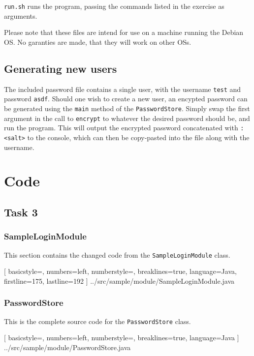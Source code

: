 \documentclass{article}
\begin{document}
\texttt{run.sh} runs the program, passing the commands listed in the exercise as
arguments.

Please note that these files are intend for use on a machine running the Debian OS.
No garanties are made, that they will work on other OSs.

\subsection{Generating new users}
The included password file contains a single user, with the username
\texttt{test} and password \texttt{asdf}.
Should one wish to create a new user, an encypted password can be
generated using the \texttt{main} method of the \texttt{PasswordStore}.
Simply swap the first argument in the call to \texttt{encrypt} to whatever
the desired password should be, and run the program.
This will output the encrypted password concatenated with \texttt{:<salt>}
to the console, which can then be copy-pasted into the file along with the username.

\newpage
\appendix

\section{Code}

\subsection{Task 3}

\subsubsection{SampleLoginModule}
\label{code:sampleloginmodule}
This section contains the changed code from the \texttt{SampleLoginModule} class.

[
	basicstyle=\footnotesize,
	numbers=left,
	numberstyle=\tiny,
	breaklines=true,
	language=Java,
	firstline=175,
	lastline=192
]
{../src/sample/module/SampleLoginModule.java}

\subsubsection{PasswordStore}
\label{code:passwordstore}
This is the complete source code for the \texttt{PasswordStore} class.

[
	basicstyle=\footnotesize,
	numbers=left,
	numberstyle=\tiny,
	breaklines=true,
	language=Java
]
{../src/sample/module/PasswordStore.java}
\end{document}
